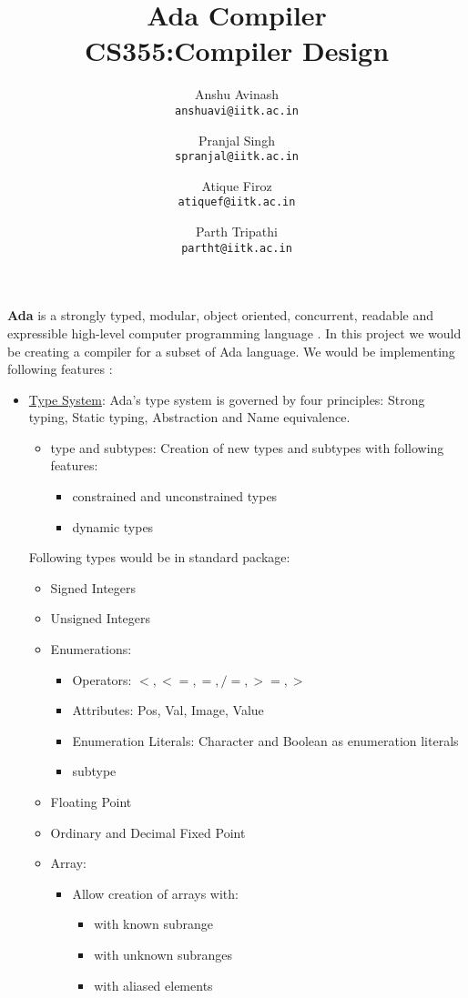\documentclass{article}
\title{
Ada Compiler \\
CS355:Compiler Design
}
\author{
Anshu Avinash\\
\texttt{anshuavi@iitk.ac.in}
\and
Pranjal Singh\\
\texttt{spranjal@iitk.ac.in}
\and
Atique Firoz\\
\texttt{atiquef@iitk.ac.in}
\and
Parth Tripathi\\
\texttt{partht@iitk.ac.in}
}
\begin{document}
\maketitle
\textbf{Ada} is a strongly typed, modular, object oriented, concurrent, readable and expressible high-level computer programming language \cite{AdaIC}. In this project we would be creating a compiler for a subset of Ada language. We would be implementing following features \cite{Wiki}:
\begin{itemize}
	\item \uline{Type System}: Ada's type system is governed by four principles: Strong typing, Static typing, Abstraction and Name equivalence.
	\begin{itemize}
		\item type and subtypes: Creation of new types and subtypes with following features:
		\begin{itemize}
			\item constrained and unconstrained types
			\item dynamic types
		\end{itemize}
	\end{itemize}
	Following types would be in standard package:
	\begin{itemize}
		\item Signed Integers
		\item Unsigned Integers
		\item Enumerations:
			\begin{itemize}
				\item Operators: $<,<=,=,/=,>=,>$
				\item Attributes: Pos, Val, Image, Value
				\item Enumeration Literals: Character and Boolean as enumeration literals
				\item subtype
			\end{itemize}
		\item Floating Point
		\item Ordinary and Decimal Fixed Point
		\item Array:
		\begin{itemize}
		\item Allow creation of arrays with:
			\begin{itemize}
				\item with known subrange
				\item with unknown subranges
				\item with aliased elements
			\end{itemize}

\end{itemize}
\end{itemize}
\end{itemize}
\end{document}

